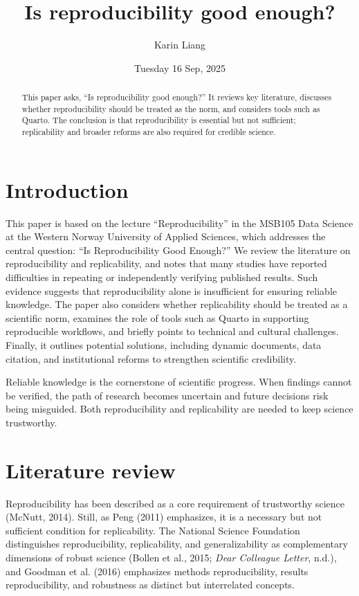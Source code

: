 \documentclass[
  a4paper,
]{article}
\title{Is reproducibility good enough?}
\author{Karin Liang}
\date{Tuesday 16 Sep, 2025}
\begin{document}
\maketitle
\begin{abstract}
This paper asks, ``Is reproducibility good enough?'' It reviews key
literature, discusses whether reproducibility should be treated as the
norm, and considers tools such as Quarto. The conclusion is that
reproducibility is essential but not sufficient; replicability and
broader reforms are also required for credible science.
\end{abstract}


\section{Introduction}\label{introduction}

This paper is based on the lecture ``Reproducibility'' in the MSB105
Data Science at the Western Norway University of Applied Sciences, which
addresses the central question: ``Is Reproducibility Good Enough?'' We
review the literature on reproducibility and replicability, and notes
that many studies have reported difficulties in repeating or
independently verifying published results. Such evidence suggests that
reproducibility alone is insufficient for ensuring reliable knowledge.
The paper also considers whether replicability should be treated as a
scientific norm, examines the role of tools such as Quarto in supporting
reproducible workflows, and briefly points to technical and cultural
challenges. Finally, it outlines potential solutions, including dynamic
documents, data citation, and institutional reforms to strengthen
scientific credibility.

Reliable knowledge is the cornerstone of scientific progress. When
findings cannot be verified, the path of research becomes uncertain and
future decisions risk being misguided. Both reproducibility and
replicability are needed to keep science trustworthy.

\section{Literature review}\label{literature-review}

Reproducibility has been described as a core requirement of trustworthy
science (McNutt, 2014). Still, as Peng (2011) emphasizes, it is a
necessary but not sufficient condition for replicability. The National
Science Foundation distinguishes reproducibility, replicability, and
generalizability as complementary dimensions of robust science (Bollen
et al., 2015; \emph{Dear {Colleague Letter}}, n.d.), and Goodman et al.
(2016) emphasizes methods reproducibility, results reproducibility, and
robustness as distinct but interrelated concepts.
\end{document}
